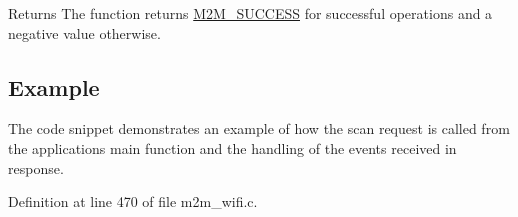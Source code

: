 \begin{DoxyReturn}{Returns}
The function returns \hyperlink{nm__common_8h_a9ef27ba27aafdd1aa3a79d3ba2c36b8f}{M2\+M\+\_\+\+S\+U\+C\+C\+E\+SS} for successful operations and a negative value otherwise. 
\end{DoxyReturn}
\hypertarget{group__WifiEnableMonitorModeFn_Example}{}\subsection{Example}\label{group__WifiEnableMonitorModeFn_Example}
The code snippet demonstrates an example of how the scan request is called from the application\textquotesingle{}s main function and the handling of the events received in response. 

Definition at line 470 of file m2m\+\_\+wifi.\+c.


